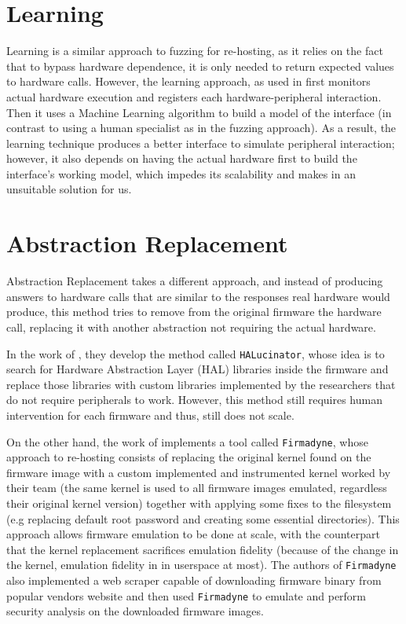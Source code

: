 \section{Learning}

Learning is a similar approach to fuzzing for re-hosting, as it relies on the fact that to bypass hardware dependence, it is only needed to return expected values to hardware calls. However, the learning approach, as used in \cite{pretender} first monitors actual hardware execution and registers each hardware-peripheral interaction. Then it uses a Machine Learning algorithm to build a model of the interface (in contrast to using a human specialist as in the fuzzing approach). As a result, the learning technique produces a better interface to simulate peripheral interaction; however, it also depends on having the actual hardware first to build the interface's working model, which impedes its scalability and makes in an unsuitable solution for us.

\section{Abstraction Replacement}

Abstraction Replacement takes a different approach, and instead of producing answers to hardware calls that are similar to the responses real hardware would produce, this method tries to remove from the original firmware the hardware call, replacing it with another abstraction not requiring the actual hardware.

In the work of \cite{halucinator}, they develop the method called {\tt HALucinator}, whose idea is to search for Hardware Abstraction Layer (HAL) libraries inside the firmware and replace those libraries with custom libraries implemented by the researchers that do not require peripherals to work. However, this method still requires human intervention for each firmware and thus, still does not scale.

On the other hand, the work of \cite{firmadyne} implements a tool called {\tt Firmadyne}, whose approach to re-hosting consists of replacing the original kernel found on the firmware image with a custom implemented and instrumented kernel worked by their team (the same kernel is used to all firmware images emulated, regardless their original kernel version) together with applying some fixes to the filesystem (e.g replacing default root password and creating some essential directories). This approach allows firmware emulation to be done at scale, with the counterpart that the kernel replacement sacrifices emulation fidelity (because of the change in the kernel, emulation fidelity in in userspace at most). The authors of {\tt Firmadyne} also implemented a web scraper capable of downloading firmware binary from popular vendors website and then used {\tt Firmadyne} to emulate and perform security analysis on the downloaded firmware images.

